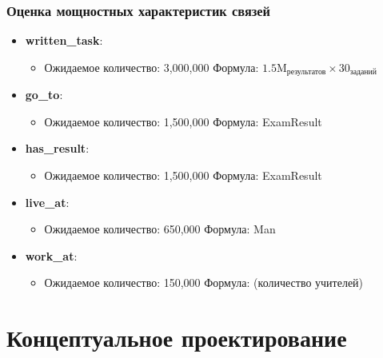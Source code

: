 \documentclass[a4paper]{article}
\begin{document}
\subsubsection{Оценка мощностных характеристик связей}
\begin{itemize}
      \item \textbf{written\_task}:
            \begin{itemize}
                  \item Ожидаемое количество: 3,000,000 \newline
                        Формула: $1.5\text{M}_{\text{результатов}} \times 30_{\text{заданий}}$
            \end{itemize}

      \item \textbf{go\_to}:
            \begin{itemize}
                  \item Ожидаемое количество: 1,500,000 \newline
                        Формула: ExamResult
            \end{itemize}

      \item \textbf{has\_result}:
            \begin{itemize}
                  \item Ожидаемое количество: 1,500,000 \newline
                        Формула: ExamResult
            \end{itemize}

      \item \textbf{live\_at}:
            \begin{itemize}
                  \item Ожидаемое количество: 650,000 \newline
                        Формула: Man
            \end{itemize}

      \item \textbf{work\_at}:
            \begin{itemize}
                  \item Ожидаемое количество: 150,000 \newline
                        Формула: (количество учителей)
            \end{itemize}
\end{itemize}


\section{Концептуальное проектирование}
\end{document}
